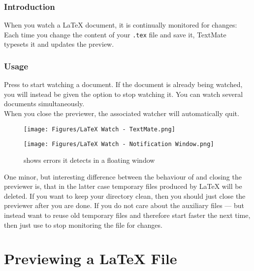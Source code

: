 \documentclass[11pt, x11names]{article}
\begin{document}
\subsubsection{Introduction}

When you watch a LaTeX document, it is continually monitored for changes: Each time you change the content of your \texttt{.tex} file and save it, TextMate typesets it and updates the preview.

\subsubsection{Usage}

Press  to start watching a document. If the document is already being watched, you will instead be given the option to stop watching it. You can watch several documents simultaneously.\\

When you close the previewer, the associated watcher will automatically quit.

\begin{figure}[htbp]
  \begin{minipage}[t]{0.5\textwidth}
    \vspace{0cm}
    \centering
      \texttt{[image: Figures/LaTeX Watch - TextMate.png]}
  \end{minipage}
  \begin{minipage}[t]{0.5\textwidth}
    \vspace{0.5cm}
    \centering
      \texttt{[image: Figures/LaTeX Watch - Notification Window.png]}
  \end{minipage}

  \caption{ shows errors it detects in a floating window}
  \label{fig:LaTeX_Watch}
\end{figure}

One minor, but interesting difference between the behaviour of  and closing the previewer is, that in the latter case temporary files produced by LaTeX will be deleted. If you want to keep your directory clean, then you should just close the previewer after you are done. If you do not care about the auxiliary files — but instead want  to reuse old temporary files and therefore start faster the next time, then just use  to stop monitoring the file for changes.

\section{Previewing a LaTeX File}
\end{document}
